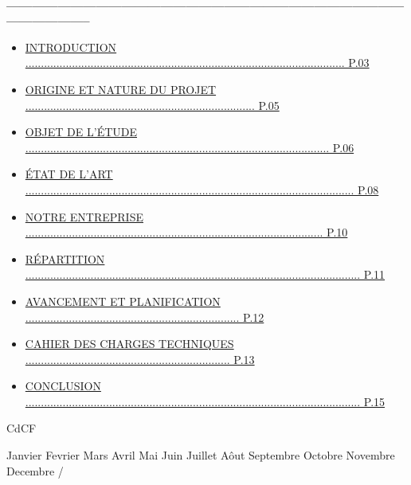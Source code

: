 
\noindent{}\\
\noindent \textbf {-----------------------------------------------------------------------------------------------------------------}
\begin{itemize}
    \item \hyperref[chapter:introduction]{\uppercase{Introduction  ....................................................................................................... P.03}}
    \item \hyperref[chapter:origine]{\uppercase{Origine et nature du projet .......................................................................... P.05}}
    \item \hyperref[chapter:objet]{\uppercase{objet de l}’\uppercase{étude .................................................................................................. P.06}}
    \item \hyperref[chapter:etat]{\uppercase{état de l}'\uppercase{art .......................................................................................................... P.08}}
    \item \hyperref[chapter:entreprise]{\uppercase{Notre entreprise ................................................................................................ P.10}}
    \item \hyperref[chapter:repartition]{\uppercase{Répartition ............................................................................................................ P.11}}
    \item \hyperref[chapter:planification]{\uppercase{Avancement et planification  ..................................................................... P.12}}
    \item \hyperref[chapter:cdct]{\uppercase{Cahier des charges techniques .................................................................. P.13}}
    \item \hyperref[chapter:Conclusion]{\uppercase{Conclusion ............................................................................................................ P.15}}
\end{itemize} 

\vspace{10cm}

\begin{center}
\vfill
\vspace{0.2cm}

CdCF \\

\newcommand{\mes}{\ifcase\month\or 
    Janvier \or Fevrier \or Mars \or Avril \or Mai \or Juin \or 
    Juillet \or Aôut \or Septembre \or Octobre \or Novembre \or 
    Decembre \fi} 
    
\def\ano{\expandafter\YEAR\the\year}
\def\YEAR#1#2#3#4{#1#2#3#4}
    
{ \mes / \ano}
\end{center}